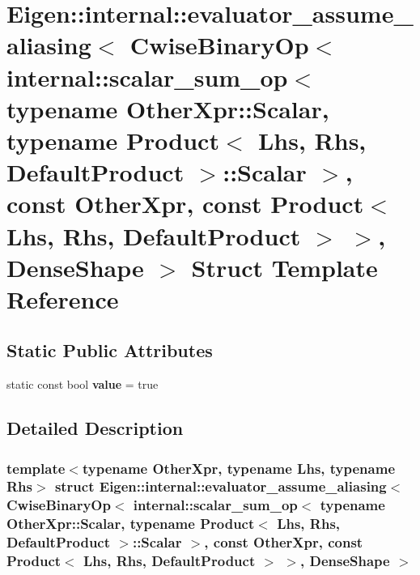 \hypertarget{struct_eigen_1_1internal_1_1evaluator__assume__aliasing_3_01_cwise_binary_op_3_01internal_1_1scac641579c4e5344f96636c29532d8e354}{}\section{Eigen\+:\+:internal\+:\+:evaluator\+\_\+assume\+\_\+aliasing$<$ Cwise\+Binary\+Op$<$ internal\+:\+:scalar\+\_\+sum\+\_\+op$<$ typename Other\+Xpr\+:\+:Scalar, typename Product$<$ Lhs, Rhs, Default\+Product $>$\+:\+:Scalar $>$, const Other\+Xpr, const Product$<$ Lhs, Rhs, Default\+Product $>$ $>$, Dense\+Shape $>$ Struct Template Reference}
\label{struct_eigen_1_1internal_1_1evaluator__assume__aliasing_3_01_cwise_binary_op_3_01internal_1_1scac641579c4e5344f96636c29532d8e354}
\subsection*{Static Public Attributes}
\begin{DoxyCompactItemize}
\item 
\mbox{\label{struct_eigen_1_1internal_1_1evaluator__assume__aliasing_3_01_cwise_binary_op_3_01internal_1_1scac641579c4e5344f96636c29532d8e354_ae0e2a522bd9f0e5d45a9c3d54e5fa388}} 
static const bool {\bfseries value} = true
\end{DoxyCompactItemize}


\subsection{Detailed Description}
\subsubsection*{template$<$typename Other\+Xpr, typename Lhs, typename Rhs$>$\newline
struct Eigen\+::internal\+::evaluator\+\_\+assume\+\_\+aliasing$<$ Cwise\+Binary\+Op$<$ internal\+::scalar\+\_\+sum\+\_\+op$<$ typename Other\+Xpr\+::\+Scalar, typename Product$<$ Lhs, Rhs, Default\+Product $>$\+::\+Scalar $>$, const Other\+Xpr, const Product$<$ Lhs, Rhs, Default\+Product $>$ $>$, Dense\+Shape $>$}



